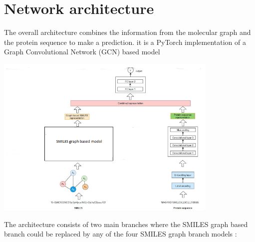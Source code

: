 \documentclass[11pt, a4paper]{article}
\begin{document}
    
            


\section{Network architecture}
    The overall architecture combines the information from the molecular graph and the protein sequence to make a prediction. it is a PyTorch implementation of a Graph Convolutional Network (GCN) based model

    \begin{center}
        \includegraphics[width=0.8\textwidth]{architecture.PNG}
    \end{center}

    The architecture consists of two main branches where the SMILES graph based branch could be replaced by any of the four SMILES graph branch models :
\end{document}
